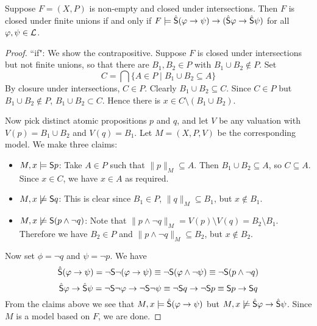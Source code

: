 \begin{proposition}
\label{exp_prop_finite_unions_frame_condition}

    Suppose $F = (X, P)$ is non-empty and closed under intersections. Then $F$
    is closed under finite unions if and only if $F \models \hat{\S}(\phi
    \limplies \psi) \limplies (\hat{\S}\phi \limplies \hat{\S}\psi)$ for all
    $\phi, \psi \in \cL$.

\begin{proof}

    ``if": We show the contrapositive. Suppose $F$ is closed under
    intersections but not finite unions, so that there are $B_1, B_2
    \in P$ with $B_1 \cup B_2 \notin P$. Set
    \[
    C = \bigcap\{A \in P \mid B_1 \cup B_2 \subseteq A\}\]
    By closure under intersections, $C \in P$. Clearly $B_1 \cup
    B_2 \subseteq C$. Since $C \in P$ but $B_1 \cup B_2 \notin
    P$, $B_1 \cup B_2 \subset C$. Hence there is $x \in C
    \setminus (B_1 \cup B_2)$.

    Now pick distinct atomic propositions $p$ and $q$, and let $V$ be any
    valuation with $V(p) = B_1 \cup B_2$ and $V(q) = B_1$. Let $M = (X, P, V)$
    be the corresponding model. We make three claims:

    \begin{itemize}

        \item $M, x \models \S p$: Take $A \in P$ such that $\|p\|_M \subseteq
              A$. Then $B_1 \cup B_2 \subseteq A$, so $C \subseteq A$. Since $x
              \in C$, we have $x \in A$ as required.

        \item $M, x \not\models \S q$: This is clear since $B_1 \in P$,
              $\|q\|_M \subseteq B_1$, but $x \notin B_1$.

        \item $M, x \not\models \S (p \land \neg q)$: Note that $\|p \land \neg
              q\|_M = V(p) \setminus V(q) = B_2 \setminus B_1$. Therefore we
              have $B_2 \in P$ and $\|p \land \neg q\|_M \subseteq B_2$, but $x
              \notin B_2$.

    \end{itemize}

    Now set $\phi = \neg q$ and $\psi = \neg p$. We have
    \[
       \hat{\S}(\phi \limplies \psi)
       = \neg\S\neg(\phi \limplies \psi)
       \equiv \neg\S(\phi \land \neg\psi)
       \equiv \neg\S(p \land \neg q)
    \]
    \[
       \hat{\S}\phi \limplies \hat{\S}\psi
       = \neg\S\neg\phi \limplies \neg\S\neg\psi
       \equiv \neg\S q \limplies \neg\S p
       \equiv \S p \limplies \S q
    \]
    From the claims above we see that $M, x \models \hat{\S}(\phi
    \limplies \psi)$ but $M, x \not\models \hat{\S}\phi \limplies
    \hat{\S}\psi$. Since $M$ is a model based on $F$, we are
    done.


\end{proof}
\end{proposition}
